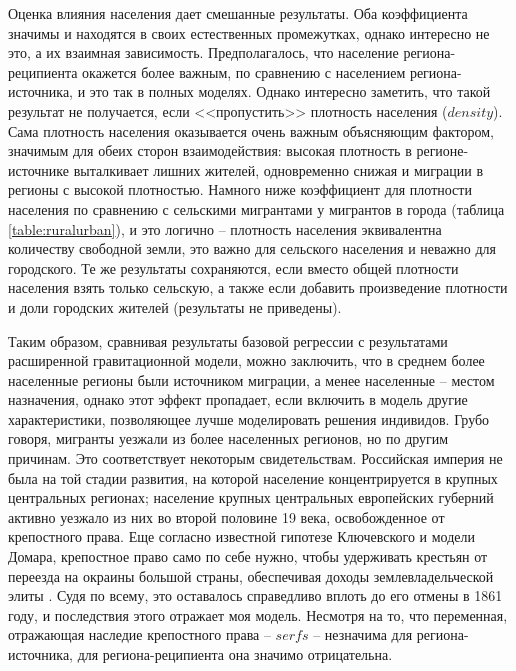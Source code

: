 \documentclass[a4paper,12pt]{article}
\begin{document}
Оценка влияния населения дает смешанные результаты. Оба коэффициента значимы и находятся в своих естественных промежутках, однако интересно не это, а их взаимная зависимость. Предполагалось, что население региона-реципиента окажется более важным, по сравнению с населением региона-источника, и это так в полных моделях. Однако интересно заметить, что такой результат не получается, если <<пропустить>> плотность населения ($density$). Сама плотность населения оказывается очень важным объясняющим фактором, значимым для обеих сторон взаимодействия: высокая плотность в регионе-источнике выталкивает лишних жителей, одновременно снижая и миграции в регионы с высокой плотностью. 
Намного ниже коэффициент для плотности населения по сравнению с сельскими мигрантами у мигрантов в города (таблица \ref{table:ruralurban}), и это логично -- плотность населения эквивалентна количеству свободной земли, это важно для сельского населения и неважно для городского.
Те же результаты сохраняются, если вместо общей плотности населения взять только сельскую, а также если добавить произведение плотности и доли городских жителей (результаты не приведены).

Таким образом, сравнивая результаты базовой регрессии с результатами расширенной гравитационной модели, можно заключить, что в среднем более населенные регионы были источником миграции, а менее населенные -- местом назначения, однако этот эффект пропадает, если включить в модель другие характеристики, позволяющее лучше моделировать решения индивидов. Грубо говоря, мигранты уезжали из более населенных регионов, но по другим причинам.
Это соответствует некоторым свидетельствам. 
Российская империя не была на той стадии развития, на которой население концентрируется в крупных центральных регионах; население крупных центральных европейских губерний активно уезжало из них во второй половине 19 века, освобожденное от крепостного права. Еще согласно известной гипотезе Ключевского и модели Домара, крепостное право само по себе нужно, чтобы удерживать крестьян от переезда на окраины большой страны, обеспечивая доходы землевладельческой элиты \citep{domar_causes_1970}. Судя по всему, это оставалось справедливо вплоть до его отмены в 1861 году, и последствия этого отражает моя модель. Несмотря на то, что переменная, отражающая наследие крепостного права -- $serfs$ -- незначима для региона-источника, для региона-реципиента она значимо отрицательна. 
\end{document}
